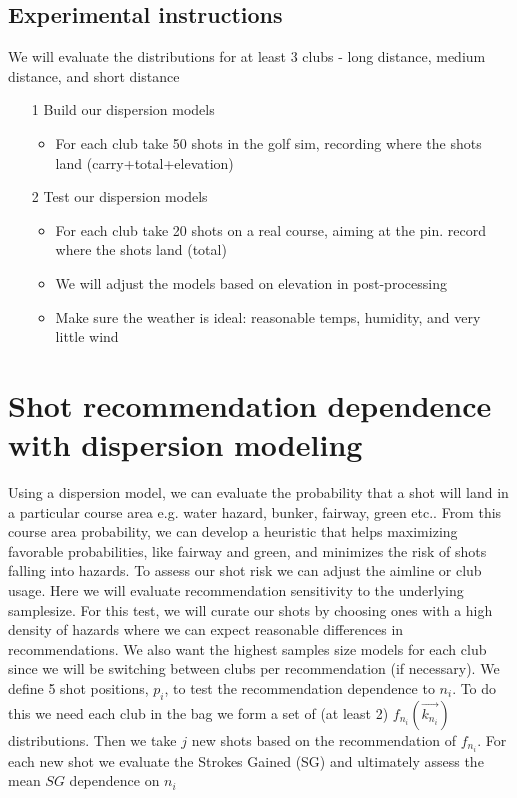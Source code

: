 \documentclass{article}
\begin{document}
\subsection{Experimental instructions}
We will evaluate the distributions for at least 3 clubs - long distance, medium distance, and short distance\\
\begin{itemize}
	\item[1] Build our dispersion models
		\begin{itemize} 
			\item For each club take 50 shots in the golf sim, recording where the shots land (carry+total+elevation)
		\end{itemize}
	\item[2] Test our dispersion models
		\begin{itemize}
			\item For each club take 20 shots on a real course, aiming at the pin. record where the shots land (total)
			\item We will adjust the models based on elevation in post-processing
			\item Make sure the weather is ideal: reasonable temps, humidity, and very little wind
		\end{itemize}
\end{itemize}


\section{Shot recommendation dependence with dispersion modeling}
Using a dispersion model, we can evaluate the probability that a shot will land in a particular course area e.g. water hazard, bunker, fairway, green etc.. From this course area probability, we can develop a heuristic that helps maximizing favorable probabilities, like fairway and green, and minimizes the risk of shots falling into hazards. To assess our shot risk we can  adjust the aimline or club usage. Here we will evaluate recommendation sensitivity to the underlying samplesize. For this test, we will curate our shots by choosing ones with a high density of hazards where we can expect reasonable differences in recommendations. We also want the highest samples size models for each club since we will be switching between clubs per recommendation (if necessary). We define 5 shot positions, $p_i$, to test the recommendation dependence to $n_i$. To do this we need each club in the bag we form a set of (at least 2) $f_{n_i}( \vec{k_{n_i}} )$ distributions. Then we take $j$ new shots based on the recommendation of $f_{n_i}$. For each new shot we evaluate the Strokes Gained (SG) and ultimately assess the mean $SG$ dependence on $n_i$
\end{document}
